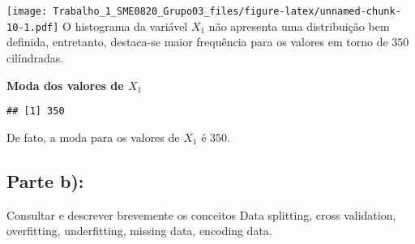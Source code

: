\documentclass[
]{article}
\newenvironment{Shaded}{\begin{snugshade}}{\end{snugshade}}
\newcommand{\ControlFlowTok}[1]{\textcolor[rgb]{0.13,0.29,0.53}{\textbf{#1}}}
\newcommand{\KeywordTok}[1]{\textcolor[rgb]{0.13,0.29,0.53}{\textbf{#1}}}
\newcommand{\NormalTok}[1]{#1}
\newcommand{\OperatorTok}[1]{\textcolor[rgb]{0.81,0.36,0.00}{\textbf{#1}}}
\newcommand{\StringTok}[1]{\textcolor[rgb]{0.31,0.60,0.02}{#1}}
\begin{document}
\texttt{[image: Trabalho\_1\_SME0820\_Grupo03\_files/figure-latex/unnamed-chunk-10-1.pdf]}
O histograma da variável \(X_1\) não apresenta uma distribuição bem
definida, entretanto, destaca-se maior frequência para os valores em
torno de \(350\) cilíndradas.

\textbf{Moda dos valores de \(X_1\)}

\begin{Shaded}
\end{Shaded}

\begin{verbatim}
## [1] 350
\end{verbatim}

De fato, a moda para os valores de \(X_1\) é \(350\).

\hypertarget{parte-b}{%
\subsection{\texorpdfstring{Parte
\textbf{b)}:}{Parte b):}}\label{parte-b}}

Consultar e descrever brevemente os conceitos Data splitting, cross
validation, overfitting, underfitting, missing data, encoding data.
\end{document}
